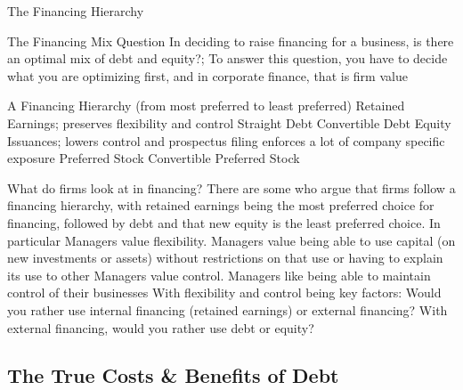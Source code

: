\documentclass[10pt]{article}
\begin{document}
    \begin{core}{The Financing Hierarchy}

      The Financing Mix Question
      In deciding to raise financing for a business, is there an optimal mix of debt and equity?; To answer this question, you have to decide what you are optimizing first, and in corporate finance, that is firm value

      A Financing Hierarchy (from most preferred to least preferred)
      Retained Earnings; preserves flexibility and control
      Straight Debt
      Convertible Debt
      Equity Issuances; lowers control and prospectus filing enforces a lot of company specific exposure
      Preferred Stock
      Convertible Preferred Stock

      What do firms look at in financing?
      There are some who argue that firms follow a financing hierarchy, with retained earnings being the most preferred choice for financing, followed by debt and that new equity is the least preferred choice. In particular
      Managers value flexibility. Managers value being able to use capital (on new investments or assets) without restrictions on that use or having to explain its use to other
      Managers value control. Managers like being able to maintain control of their businesses
      With flexibility and control being key factors:
      Would you rather use internal financing (retained earnings) or external financing?
      With external financing, would you rather use debt or equity?

    \end{core}

  \subsection{The True Costs \& Benefits of Debt}
\end{document}
